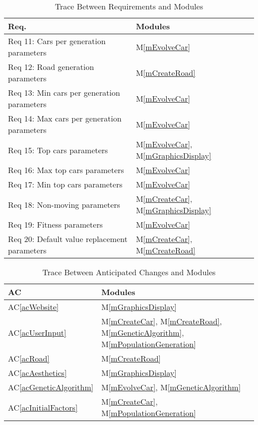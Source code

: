 \documentclass[12pt, titlepage]{article}
\newcommand{\acref}[1]{AC\ref{#1}}
\newcommand{\mref}[1]{M\ref{#1}}
\begin{document}
\begin{table}[H]
\centering
\begin{tabular}{p{} p{}}
\toprule
\textbf{Req.} & \textbf{Modules}\\
\midrule
Req 11: Cars per generation parameters &\mref{mEvolveCar}\\ 
Req 12: Road generation parameters & \mref{mCreateRoad}\\
Req 13: Min cars per generation parameters & \mref{mEvolveCar}\\
Req 14: Max cars per generation parameters & \mref{mEvolveCar}\\
Req 15: Top cars parameters & \mref{mEvolveCar}, 
\mref{mGraphicsDisplay}\\
Req 16: Max top cars parameters & \mref{mEvolveCar}\\
Req 17: Min top cars parameters & \mref{mEvolveCar}\\
Req 18: Non-moving parameters & \mref{mCreateCar}, \mref{mGraphicsDisplay}\\
Req 19: Fitness parameters & \mref{mEvolveCar}\\
Req 20: Default value replacement parameters & \mref{mCreateCar}, 
\mref{mCreateRoad}\\
\bottomrule
\end{tabular}
\caption{Trace Between Requirements and Modules}
\label{TblRT2}
\end{table}

\begin{table}[H]
\centering
\begin{tabular}{p{} p{}}
\toprule
\textbf{AC} & \textbf{Modules}\\
\midrule
\acref{acWebsite} & \mref{mGraphicsDisplay}\\
\acref{acUserInput} & \mref{mCreateCar}, \mref{mCreateRoad}, 
\mref{mGeneticAlgorithm}, \mref{mPopulationGeneration}\\
\acref{acRoad} & \mref{mCreateRoad}\\
\acref{acAesthetics} & \mref{mGraphicsDisplay}\\
\acref{acGeneticAlgorithm} & \mref{mEvolveCar}, \mref{mGeneticAlgorithm}\\
\acref{acInitialFactors} & \mref{mCreateCar}, \mref{mPopulationGeneration}\\
\bottomrule
\end{tabular}
\caption{Trace Between Anticipated Changes and Modules}
\label{TblACT}
\end{table}
\end{document}

